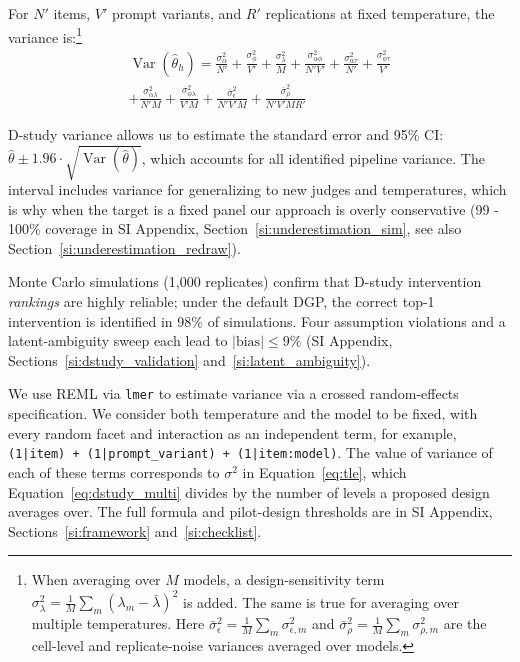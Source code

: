 \documentclass{article}
\DeclareMathOperator{\Var}{Var}
\begin{document}
For $N'$ items, $V'$ prompt variants, and $R'$ replications at fixed temperature, the variance is:\footnote{When averaging over $M$ models, a design-sensitivity term $\sigma^2_\lambda = \frac{1}{M}\sum_m(\lambda_m - \bar{\lambda})^2$ is added. The same is true for averaging over multiple temperatures. Here $\bar{\sigma}^2_\epsilon = \frac{1}{M}\sum_m \sigma^2_{\epsilon,m}$ and $\bar{\sigma}^2_\rho = \frac{1}{M}\sum_m \sigma^2_{\rho,m}$ are the cell-level and replicate-noise variances averaged over models.}
\begin{equation}
\label{eq:dstudy_multi}
\begin{split}
\Var(\hat{\theta}_h) = \frac{\sigma^2_\alpha}{N'} + \frac{\sigma^2_\phi}{V'} + \frac{\sigma^2_\lambda}{M} + \frac{\sigma^2_{\alpha\phi}}{N'V'} + \frac{\sigma^2_{\alpha\tau}}{N'} + \frac{\sigma^2_{\phi\tau}}{V'} \\
+ \frac{\sigma^2_{\alpha\lambda}}{N'M} + \frac{\sigma^2_{\phi\lambda}}{V'M} + \frac{\bar{\sigma}^2_\epsilon}{N'V'M} + \frac{\bar{\sigma}^2_\rho}{N'V'MR'}
\end{split}
\end{equation}

D-study variance allows us to estimate the standard error and 95\% CI: $\hat{\theta} \pm 1.96 \cdot \sqrt{\Var(\hat{\theta})}$, which accounts for all identified pipeline variance. The interval includes variance for generalizing to new judges and temperatures, which is why when the target is a fixed panel our approach is overly conservative (99 - 100\% coverage in SI Appendix, Section~\ref{si:underestimation_sim}, see also Section~\ref{si:underestimation_redraw}). 

Monte Carlo simulations (1,000 replicates) confirm that D-study intervention \emph{rankings} are highly reliable; under the default DGP, the correct top-1 intervention is identified in 98\% of simulations. Four assumption violations and a latent-ambiguity sweep each lead to $|\text{bias}| \leq 9\%$ (SI Appendix, Sections~\ref{si:dstudy_validation} and~\ref{si:latent_ambiguity}).

We use REML \citep{jiang1996reml} via \texttt{lmer} \citep{bates2015lme4} to estimate variance via a crossed random-effects specification. We consider both temperature and the model to be fixed, with every random facet and interaction as an independent term, for example, \texttt{(1|item) + (1|prompt\_variant) + (1|item:model)}. The value of variance of each of these terms corresponds to $\sigma^2$ in Equation~\ref{eq:tle}, which Equation~\ref{eq:dstudy_multi} divides by the number of levels a proposed design averages over. The full formula and pilot-design thresholds are in SI Appendix, Sections~\ref{si:framework} and~\ref{si:checklist}.
\end{document}
